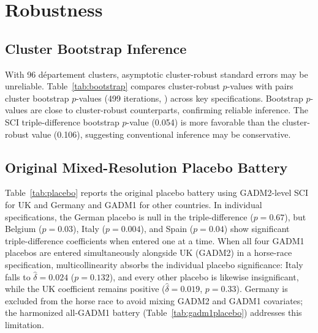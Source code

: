\documentclass[12pt]{article}
\begin{document}
{\footnotesize}


\section{Robustness}\label{sec:robustness}

\subsection{Cluster Bootstrap Inference}

With 96 d\'epartement clusters, asymptotic cluster-robust standard errors may be unreliable. Table~\ref{tab:bootstrap} compares cluster-robust $p$-values with pairs cluster bootstrap $p$-values (499 iterations, \citealp{cameron2008bootstrap}) across key specifications. Bootstrap $p$-values are close to cluster-robust counterparts, confirming reliable inference. The SCI triple-difference bootstrap $p$-value (0.054) is more favorable than the cluster-robust value (0.106), suggesting conventional inference may be conservative.

{\footnotesize}

\subsection{Original Mixed-Resolution Placebo Battery}

Table~\ref{tab:placebo} reports the original placebo battery using GADM2-level SCI for UK and Germany and GADM1 for other countries. In individual specifications, the German placebo is null in the triple-difference ($p = 0.67$), but Belgium ($p = 0.03$), Italy ($p = 0.004$), and Spain ($p = 0.04$) show significant triple-difference coefficients when entered one at a time. When all four GADM1 placebos are entered simultaneously alongside UK (GADM2) in a horse-race specification, multicollinearity absorbs the individual placebo significance: Italy falls to $\hat{\delta} = 0.024$ ($p = 0.132$), and every other placebo is likewise insignificant, while the UK coefficient remains positive ($\hat{\delta} = 0.019$, $p = 0.33$). Germany is excluded from the horse race to avoid mixing GADM2 and GADM1 covariates; the harmonized all-GADM1 battery (Table~\ref{tab:gadm1placebo}) addresses this limitation.
\end{document}
